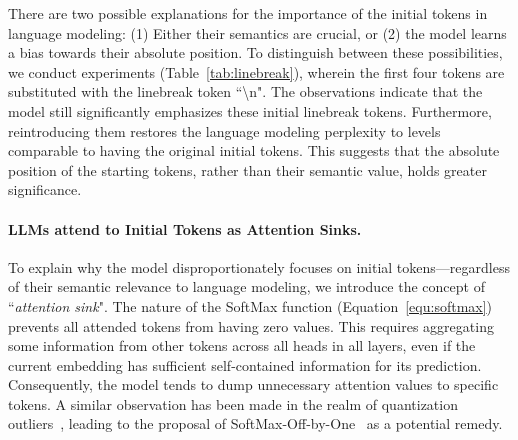 \documentclass{article} \usepackage{iclr2024_conference,times}
\newcommand{\myparagraph}[1]{\vspace{0pt}\paragraph{#1}}
\begin{document}
There are two possible explanations for the importance of the initial tokens in language modeling: (1) Either their semantics are crucial, or 
(2) the model learns a bias towards their absolute position. To distinguish between these possibilities, we conduct experiments (Table~\ref{tab:linebreak}), wherein the first four tokens are substituted with the linebreak token ``\textbackslash n". The observations indicate that the model still significantly emphasizes these initial linebreak tokens. Furthermore, reintroducing them restores the language modeling perplexity to levels comparable to having the original initial tokens. This suggests that the absolute position of the starting tokens, rather than their semantic value, holds greater significance.
\vspace{-0.5em}
\myparagraph{LLMs attend to Initial Tokens as Attention Sinks.}
\label{sec:attention_sink}
To explain why the model disproportionately focuses on initial tokens—regardless of their semantic relevance to language modeling, we introduce the concept of ``\emph{attention sink}". The nature of the SoftMax function (Equation~\ref{equ:softmax}) prevents all attended tokens from having zero values. This requires aggregating some information from other tokens across all heads in all layers, even if the current embedding has sufficient self-contained information for its prediction. Consequently, the model tends to dump unnecessary attention values to specific tokens. A similar observation has been made in the realm of quantization outliers~\citep{xiao2023smoothquant,bondarenko2023quantizable}, leading to the proposal of SoftMax-Off-by-One~\citep{softmax1} as a potential remedy.
\vspace{1em}
\end{document}

